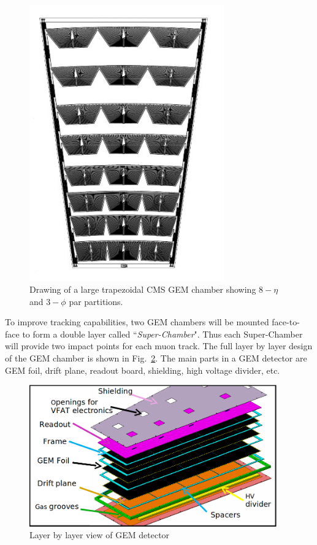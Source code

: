 \begin{figure}[!htbp]
    \begin{center}
        \includegraphics[angle=-90,width=0.75\textwidth]{figures/GEM/gemTrapezoidal.png}
        \caption{Drawing of a large trapezoidal CMS GEM chamber showing $8-\eta$ and $3-\phi$ par partitions.}
        \label{fig:gemTrapezoidal}
    \end{center}
\end{figure} 
To improve tracking capabilities, two GEM chambers will be mounted face-to-face to form a double layer called ``\textit{Super-Chamber}".
Thus each Super-Chamber will provide two impact points for each muon track.
The full layer by layer design of the GEM chamber is shown in Fig.~\ref{fig:GE1/1}. 
The main parts in a GEM detector are GEM foil, drift plane, readout board, shielding, high voltage divider, etc.
\begin{figure}[!htbp]
    \begin{center}
        \includegraphics[width=0.95\textwidth]{figures/GEM/GE11cad.png}
        \caption{Layer by layer view of GEM detector}
        \label{fig:GE1/1}
    \end{center}
\end{figure} 
